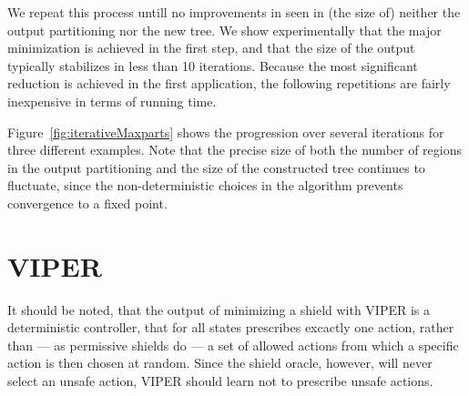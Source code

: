 We repeat this process untill no improvements in seen in (the size of) neither
the output partitioning nor the new tree. We show experimentally that the major
minimization is achieved in the first step, and that the size of the
output typically stabilizes in less than 10 iterations. Because the most
significant reduction is achieved in the first application, the following
repetitions are fairly inexpensive in terms of running time.

Figure~\cref{fig:iterativeMaxparts} shows the progression over several
iterations for three different examples. Note that the precise size of both the
number of regions in the output partitioning and the size of the constructed
tree continues to fluctuate, since the non-deterministic choices in the
algorithm prevents convergence to a fixed point.

\section{VIPER}%
\label{sec:viper}

\textcolor {orange} {\lipsum[2]}

It should be noted, that the output of minimizing a shield with
\textsc{VIPER} is a deterministic controller, that for all states prescribes
excactly one action, rather than --- as permissive shields do --- a set of
allowed actions from which a specific action is then chosen at random. Since the
shield oracle, however, will never select an unsafe action, \textsc{VIPER}
should learn not to prescribe unsafe actions.

